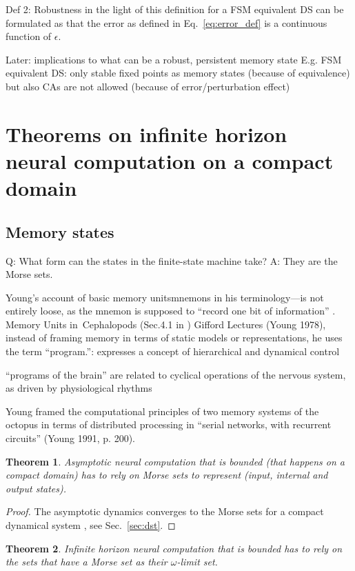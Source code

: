 \documentclass{scrartcl}
\newtheorem{theorem}{Theorem}
\theoremstyle{definition}
\theoremstyle{remark}
\begin{document}
Def 2: Robustness in the light of this definition for a FSM equivalent DS can be formulated as that the error as defined in Eq.~\ref{eq:error_def} is a continuous function of $\epsilon$.

Later: implications to what can be a robust, persistent memory state
E.g.  FSM equivalent DS: only stable fixed points as memory states (because of equivalence)
but also CAs are not allowed (because of error/perturbation effect)


\section{Theorems on infinite horizon neural computation on a compact domain}\label{sec:theorems}


\subsection{Memory states}%
Q: What form can the states in the finite-state machine take?
A: They are the Morse sets.

Young’s account of basic memory unitsmnemons in his terminology—is not entirely loose, as the mnemon is supposed to “record one bit of information” \citep{young1978}. %
Memory Units in Cephalopods (Sec.4.1 in \citep{milkowski2018})
Gifford Lectures (Young 1978), instead of framing memory in terms of static models or representations, he uses the term “program.”: expresses a concept of hierarchical and dynamical control

“programs of the brain” are related to cyclical operations of the nervous system, as driven by physiological rhythms

Young framed the computational principles of two memory systems of the octopus in terms of distributed processing in “serial networks, with recurrent circuits” (Young 1991, p. 200).

\begin{theorem}
Asymptotic neural computation that is bounded (that happens on a compact domain) has to rely on Morse sets to represent (input, internal and output states).
\end{theorem}

\begin{proof}
The asymptotic dynamics converges to the Morse sets for a compact dynamical system \cite{conley1978}, see Sec.~\ref{sec:dst}.
\end{proof}


\begin{theorem}	
Infinite horizon neural computation that is bounded has to rely on the sets that have a Morse set as their $\omega$-limit set.
\end{theorem}	
\end{document}

